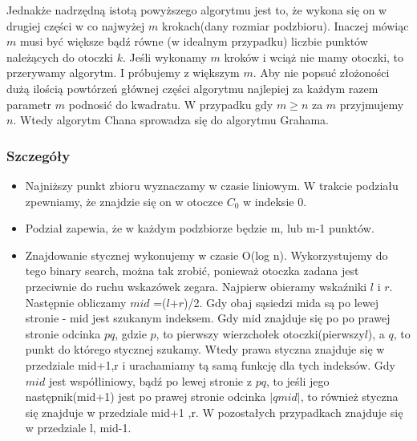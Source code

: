 \documentclass[11pt]{article}
\theoremstyle{remark} \newtheorem{definition}{def.}
\theoremstyle{definition} \newtheorem{twierdzenie}{tw.}
\begin{document}
    Jednakże nadrzędną istotą powyższego algorytmu jest to, że wykona się on w drugiej
    części w co najwyżej $m$ krokach(dany rozmiar podzbioru). Inaczej mówiąc $m$ musi być
    większe bądź równe (w idealnym przypadku) liczbie punktów należących do otoczki $k$.
    Jeśli wykonamy $m$ kroków i wciąż nie mamy otoczki, to przerywamy algorytm. I 
    próbujemy z większym $m$. Aby nie popsuć złożoności dużą ilością powtórzeń głównej
    części algorytmu najlepiej za każdym razem parametr $m$ podnosić do kwadratu. W przypadku
    gdy $m \ge n$ za $m$ przyjmujemy $n$. Wtedy algorytm Chana sprowadza się do algorytmu 
    Grahama.
    \subsubsection{Szczegóły}  
    \begin{itemize}
        \item   Najniższy punkt zbioru wyznaczamy w czasie liniowym. W trakcie podziału zpewniamy, że znajdzie się on w otoczce $C_0$ w indeksie $0$.
        \item   Podział zapewia, że w każdym podzbiorze będzie m, lub m-1 punktów.
        \item   Znajdowanie stycznej wykonujemy w czasie O(log n). Wykorzystujemy do tego binary search, można tak zrobić, ponieważ otoczka
                zadana jest przeciwnie do ruchu wskazówek zegara. Najpierw obieramy wskaźniki $l$ i $r$. Następnie obliczamy $mid$ =($l$+$r$)/2. Gdy obaj sąsiedzi
                mida są po lewej stronie - mid jest szukanym indeksem. Gdy mid znajduje się po po prawej stronie odcinka $pq$, gdzie $p$, to pierwszy wierzchołek otoczki(pierwszy$l$),
                a $q$, to punkt do którego stycznej szukamy. Wtedy prawa styczna znajduje się w przedziale mid+1,r i urachamiamy tą samą funkcję dla tych indeksów.
                Gdy $mid$ jest współliniowy, bądź po lewej stronie z $pq$, to jeśli jego następnik(mid+1) jest po prawej stronie odcinka $|q mid|$, to również styczna się znajduje w przedziale
                mid+1 ,r. W pozostałych przypadkach znajduje się w przedziale l, mid-1. 
     \end{itemize}     
\end{document}
